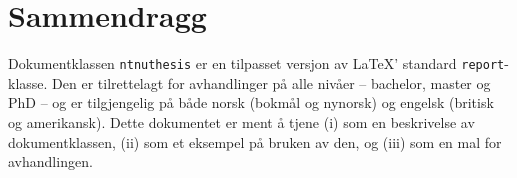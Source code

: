 \chapter*{Sammendragg}

Dokumentklassen \texttt{ntnuthesis} er en tilpasset versjon av \LaTeX' standard \texttt{report}-klasse. Den er tilrettelagt for avhandlinger på alle nivåer – bachelor, master og PhD – og er tilgjengelig på både norsk (bokmål og nynorsk) og engelsk (britisk og amerikansk). Dette dokumentet er ment å tjene (i) som en beskrivelse av dokument\-klassen, (ii) som et eksempel på bruken av den, og (iii) som en mal for avhandlingen.
